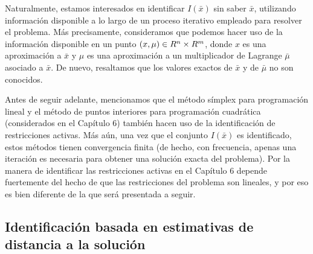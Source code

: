 Naturalmente, estamos interesados en identificar $I(\bar{x})$ sin saber $\bar{x}$, utilizando información disponible a lo largo de un proceso iterativo empleado para resolver el problema. Más precisamente, consideramos que podemos hacer uso de la información disponible en un punto $(x, \mu) \in R^n \times R^m$, donde $x$ es una aproximación a $\bar{x}$ y $\mu$ es una aproximación a un multiplicador de Lagrange $\bar{\mu}$ asociado a $\bar{x}$. De nuevo, resaltamos que los valores exactos de $\bar{x}$ y de $\bar{\mu}$ no son conocidos.

Antes de seguir adelante, mencionamos que el método símplex para programación lineal y el método de puntos interiores para programación cuadrática (considerados en el Capítulo 6) también hacen uso de la identificación de restricciones activas. Más aún, una vez que el conjunto $I(\bar{x})$ es identificado, estos métodos tienen convergencia finita (de hecho, con frecuencia, apenas una iteración es necesaria para obtener una solución exacta del problema). Por la manera de identificar las restricciones activas en el Capítulo 6 depende fuertemente del hecho de que las restricciones del problema son lineales, y por eso es bien diferente de la que será presentada a seguir.

\subsection{Identificación basada en estimativas de distancia a la solución}\label{v2:sec:4.7.1}

